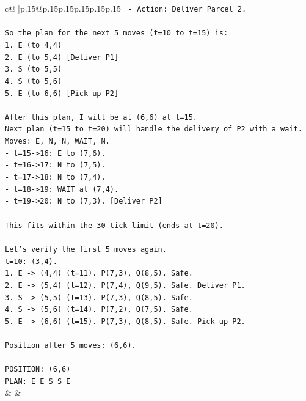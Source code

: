\documentclass{article}
\begin{document}
{\begin{supertabular}{c@{$\;$}|p{.15\linewidth}@{}p{.15\linewidth}p{.15\linewidth}p{.15\linewidth}p{.15\linewidth}p{.15\linewidth}}
{{{\texttt{        {-} Action: Deliver Parcel 2.} \\
\\ 
\texttt{So the plan for the next 5 moves (t=10 to t=15) is:} \\
\texttt{1. E (to 4,4)} \\
\texttt{2. E (to 5,4) {[}Deliver P1{]}} \\
\texttt{3. S (to 5,5)} \\
\texttt{4. S (to 5,6)} \\
\texttt{5. E (to 6,6) {[}Pick up P2{]}} \\
\\ 
\texttt{After this plan, I will be at (6,6) at t=15.} \\
\texttt{Next plan (t=15 to t=20) will handle the delivery of P2 with a wait.} \\
\texttt{Moves: E, N, N, WAIT, N.} \\
\texttt{{-} t=15{-}>16: E to (7,6).} \\
\texttt{{-} t=16{-}>17: N to (7,5).} \\
\texttt{{-} t=17{-}>18: N to (7,4).} \\
\texttt{{-} t=18{-}>19: WAIT at (7,4).} \\
\texttt{{-} t=19{-}>20: N to (7,3). {[}Deliver P2{]}} \\
\\ 
\texttt{This fits within the 30 tick limit (ends at t=20).} \\
\\ 
\texttt{Let's verify the first 5 moves again.} \\
\texttt{t=10: (3,4).} \\
\texttt{1. E {-}> (4,4) (t=11). P(7,3), Q(8,5). Safe.} \\
\texttt{2. E {-}> (5,4) (t=12). P(7,4), Q(9,5). Safe. Deliver P1.} \\
\texttt{3. S {-}> (5,5) (t=13). P(7,3), Q(8,5). Safe.} \\
\texttt{4. S {-}> (5,6) (t=14). P(7,2), Q(7,5). Safe.} \\
\texttt{5. E {-}> (6,6) (t=15). P(7,3), Q(8,5). Safe. Pick up P2.} \\
\\ 
\texttt{Position after 5 moves: (6,6).} \\
\\ 
\texttt{POSITION: (6,6)} \\
\texttt{PLAN: E E S S E} \\
            }
        }
    }
    & & \\ \\


\end{supertabular}}
\end{document}
